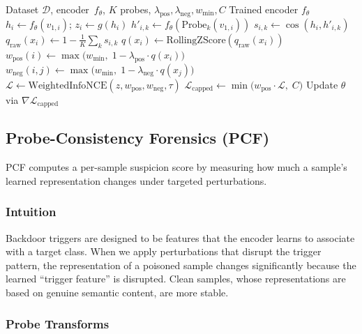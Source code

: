 \documentclass[11pt,a4paper]{article}
\begin{document}
\begin{algorithm}[H]
\caption{PRCL Training}
\label{alg:prcl}
\begin{algorithmic}[1]
\Require Dataset $\mathcal{D}$, encoder~$f_\theta$, $K$ probes,
  $\lambda_{\text{pos}},\lambda_{\text{neg}},w_{\min},C$
\Ensure Trained encoder $f_\theta$
    \State $h_i\gets f_\theta(v_{1,i})$; \quad $z_i\gets g(h_i)$
      \State $h'_{i,k}\gets f_\theta(\text{Probe}_k(v_{1,i}))$
      \State $s_{i,k}\gets\cos(h_i, h'_{i,k})$
    \EndFor
    \State $q_{\text{raw}}(x_i)\gets 1-\tfrac{1}{K}\sum_k s_{i,k}$
    \State $q(x_i)\gets\text{RollingZScore}(q_{\text{raw}}(x_i))$
    \State $w_{\text{pos}}(i)\gets\max\bigl(w_{\min},\;
      1-\lambda_{\text{pos}}\cdot q(x_i)\bigr)$
    \State $w_{\text{neg}}(i,j)\gets\max\bigl(w_{\min},\;
      1-\lambda_{\text{neg}}\cdot q(x_j)\bigr)$
    \State $\mathcal{L}\gets\text{WeightedInfoNCE}(z,w_{\text{pos}},
      w_{\text{neg}},\tau)$
    \State $\mathcal{L}_{\text{capped}}\gets
      \min\bigl(w_{\text{pos}}\cdot\mathcal{L},\;C\bigr)$
    \State Update $\theta$ via $\nabla\mathcal{L}_{\text{capped}}$
  \EndFor
\EndFor
\end{algorithmic}
\end{algorithm}

\subsection{Probe-Consistency Forensics (PCF)}

PCF computes a per-sample suspicion score by measuring how much a sample's
learned representation changes under targeted perturbations.

\subsubsection{Intuition}

Backdoor triggers are designed to be features that the encoder learns to
associate with a target class.  When we apply perturbations that disrupt the
trigger pattern, the representation of a poisoned sample changes significantly
because the learned ``trigger feature'' is disrupted.  Clean samples, whose
representations are based on genuine semantic content, are more stable.

\subsubsection{Probe Transforms}
\end{document}
